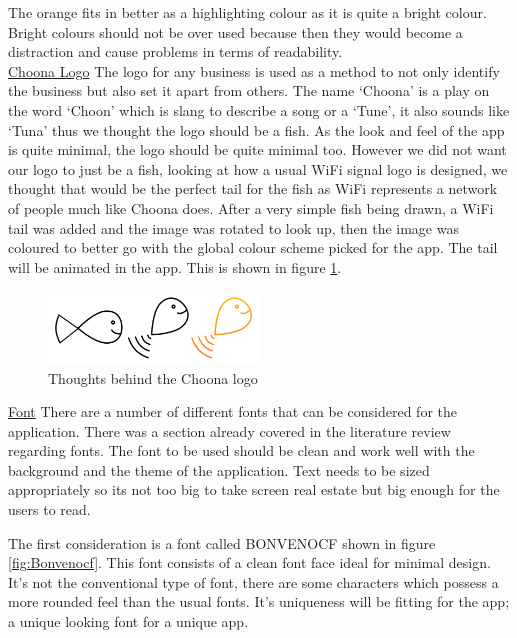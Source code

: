 The orange fits in better as a highlighting colour as it is quite a bright colour. Bright colours should not be over used because then they would become a distraction and cause problems in terms of readability.  \\

\noindent\underline{Choona Logo}\newline
The logo for any business is used as a method to not only identify the business but also set it apart from others. The name `Choona' is a play on the word `Choon' which is slang to describe a song or a `Tune', it also sounds like `Tuna' thus we thought the logo should be a fish. As the look and feel of the app is quite minimal, the logo should be quite minimal too. However we did not want our logo to just be a fish, looking at how a usual WiFi signal logo is designed, we thought that would be the perfect tail for the fish as WiFi represents a network of people much like Choona does. After a very simple fish being drawn, a WiFi tail was added and the image was rotated to look up, then the image was coloured to better go with the global colour scheme picked for the app. The tail will be animated in the app. This is shown in figure \ref{fig:logo}.

\begin{figure}[h!]
\centering
\includegraphics[width=0.5\textwidth]{./img/logothinking.png}
\caption{Thoughts behind the Choona logo}
\label{fig:logo}
\end{figure}


\noindent\underline{Font}\newline
There are a number of different fonts that can be considered for the application. There was a section already covered in the literature review regarding fonts. The font to be used should be clean and work well with the background and the theme of the application. Text needs to be sized appropriately so its not too big to take screen real estate but big enough for the users to read.

The first consideration is a font called BONVENOCF shown in figure \ref{fig:Bonvenocf}. This font consists of a clean font face ideal for minimal design. It's not the conventional type of font, there are some characters which possess a more rounded feel than the usual fonts. It's uniqueness will be fitting for the app; a unique looking font for a unique app. 

